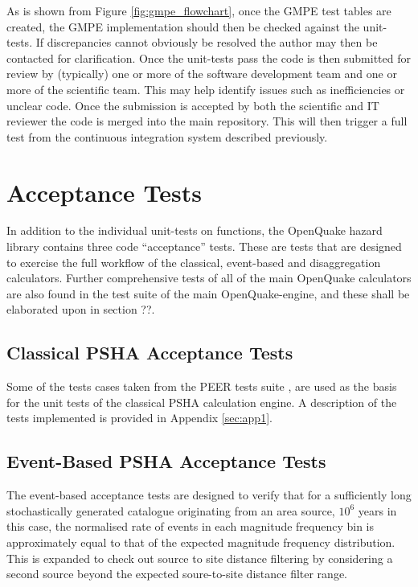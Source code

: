 As is shown from Figure \ref{fig:gmpe_flowchart}, once the GMPE test 
tables are created, the GMPE implementation should then be checked 
against the unit-tests. If discrepancies cannot obviously be resolved
the author may then be contacted for clarification. 
Once the unit-tests pass the code is then submitted for review by 
(typically) one or more of the software development team and one or
more of the scientific team. This may help identify issues such as 
inefficiencies or unclear code. Once the submission is accepted by 
both the scientific and IT reviewer the code is merged into the main
repository. 
This will then trigger a full test from the continuous integration 
system described previously.

%
\section{Acceptance Tests}
In addition to the individual unit-tests on functions, the OpenQuake hazard 
library contains three code ``acceptance'' tests. These are tests that are 
designed to exercise the full workflow of the classical, event-based and 
disaggregation calculators. Further comprehensive tests of all of the main 
OpenQuake calculators are also found in the test suite of the main 
OpenQuake-engine, and these shall be elaborated upon in section ??.
%
\subsection{Classical PSHA Acceptance Tests}
Some of the tests cases taken from the PEER tests suite \citep{thomas2010}, 
are used as the basis for the unit tests of the classical PSHA 
calculation engine. A description of the tests implemented is 
provided in Appendix \ref{sec:app1}.

\subsection{Event-Based PSHA Acceptance Tests}

The event-based acceptance tests are designed to verify that for 
a sufficiently long stochastically generated catalogue originating
from an area source, $10^6$ years in this case, the normalised 
rate of events in each magnitude frequency bin is approximately
equal to that of the expected magnitude frequency distribution. 
%
This is expanded to check out source to site distance filtering by 
considering a second source beyond the expected soure-to-site 
distance filter range. 

